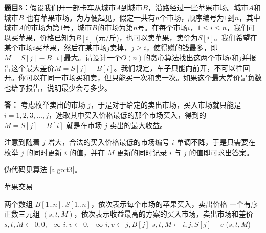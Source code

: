 \documentclass[12pt,a4paper]{ctexart}
\begin{document}
\clearpage

\vspace{10pt}
\noindent
{\bf 题目3：}假设我们开一部卡车从城市$A$到城市$B$，沿路经过一些苹果市场。城市$A$和城市$B$ 也有苹果市场。为方便起见，假定一共有$n$个市场，顺序编号为$1$到$n$，其中城市$A$的市场为第$1$号，城市$B$的市场为第$n$号。在每个市场$i$，$1 \leq i \leq n$，我们可以买苹果，价格已知为$B[i]$ (元/斤)，也可以卖苹果，卖价为$S[i]$。我们希望在某个市场$i$买苹果，然后在某市场$j$卖掉，$j \geq i$，使得赚的钱最多，即$M = S[j] - B[i]$最大。请设计一个$O(n)$的贪心算法找出这两个市场$i$和$j$并报告这个最大差价$M = S[j] - B[i]$。我们规定，车子只能向前开，不可以往回开。你可以在同一市场买和卖，但只能买一次和卖一次。如果这个最大差价是负数也给予报告，说明最少会亏多少。

\vspace{5pt}
\noindent
{\bf 答：} 考虑枚举卖出的市场 $j$，于是对于给定的卖出市场，买入市场就只能是 $i = 1,2,3,\ldots,j$，选取其中买入价格最低的那个市场买入，得到的 $M=S[j]-B[i]$ 就是在市场 $j$ 卖出的最大收益。

注意到随着 $j$ 增大，合法的买入价格最低的市场编号 $i$ 单调不降，于是只需要在枚举 $j$ 的同时更新 $i$ 的值，并在 $M$ 更新的同时记录 $i$ 与 $j$ 的值即可求出答案。

伪代码见算法 \ref{algo:t3}。

\begin{algorithm}
  \caption{苹果交易} \label{algo:t3}
  \begin{algorithmic}
    \Require 两个数组 $B[1..n], S[1..n]$，依次表示每个市场的苹果买入，卖出价格
    \Ensure 一个有序正数三元组 $(s, t, M)$，依次表示收益最高的方案的买入市场，卖出市场和差价
      \State $s, t, M \gets 0, 0, -\infty$
      \State $i, v \gets 0, +\infty$ 
          \State $i, v \gets j, B[j]$
        \EndIf
          \State $s, t, M \gets i, j, S[j]-v$
        \EndIf
      \EndFor
      \State \Return ($s, t, M$)
    \EndFunction
  \end{algorithmic}
\end{algorithm}

\end{document}
